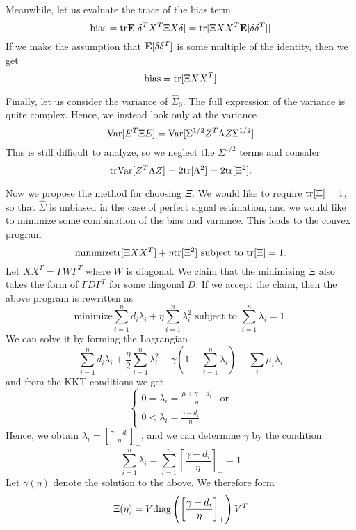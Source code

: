 \documentclass[12pt]{article}
\begin{document}
Meanwhile, let us evaluate the trace of the bias term
\[
\text{bias} = \text{tr}\textbf{E}[\delta^TX^T \Xi X \delta] = \text{tr}[\Xi XX^T \textbf{E}[\delta \delta^T]]
\]
If we make the assumption that $\textbf{E}[\delta \delta^T]$ is some multiple of the identity, then we get
\[
\text{bias} = \text{tr}[\Xi XX^T]
\]

Finally, let us consider the variance of $\hat{\Sigma}_0$.
The full expression of the variance is quite complex.
Hence, we instead look only at the variance
\[
\text{Var}[E^T \Xi E] = \text{Var}[\Sigma^{1/2} Z^T \Lambda Z \Sigma^{1/2}]
\]
This is still difficult to analyze, so we neglect the $\Sigma^{1/2}$ terms and consider
\[
\text{tr}\text{Var}[Z^T \Lambda Z] = 2\text{tr}[\Lambda^2] = 2\text{tr}[\Xi^2].
\]

Now we propose the method for choosing $\Xi$.  We would like to
require $\text{tr}[\Xi] = 1$, so that $\hat{\Sigma}$ is unbiased in the case
of perfect signal estimation, and we would like to minimize some
combination of the bias and variance.  This leads to the convex program
\[
\text{minimize} \text{tr}[\Xi XX^T] + \eta \text{tr}[\Xi^2]\text{ subject to }\text{tr}[\Xi]=1.
\]
Let $XX^T = \Gamma W\Gamma^T$ where $W$ is diagonal.  We claim that
the minimizing $\Xi$ also takes the form of $\Gamma D \Gamma^T$ for
some diagonal $D$.  If we accept the claim, then the above program is
rewritten as
\[
\text{minimize} \sum_{i=1}^n d_i \lambda_i + \eta \sum_{i=1}^n \lambda_i^2 \text{ subject to }\sum_{i=1}^n \lambda_i=1.
\]
We can solve it by forming the Lagrangian
\[
\sum_{i=1}^n d_i \lambda_i + \frac{\eta}{2} \sum_{i=1}^n \lambda_i^2 + \gamma \left(1 - \sum_{i=1}^n \lambda_i\right) - \sum_i \mu_i \lambda_i
\]
and from the KKT conditions we get
\[
\begin{cases}
0 = \lambda_i = \frac{\mu+\gamma - d_i }{\eta} & \text{or}\\
0 < \lambda_i = \frac{\gamma - d_i }{\eta}
\end{cases}
\]
Hence, we obtain $\lambda_i = [\frac{\gamma - d_i }{\eta}]_+$,
and we can determine $\gamma$ by the condition
\[
\sum_{i=1}^n\lambda_i = \sum_{i=1}^n \left[\frac{\gamma - d_i }{\eta}\right]_+
= 1
\]
Let $\gamma(\eta)$ denote the solution to the above.
We therefore form
\[
\Xi(\eta) = V \text{diag}\left(\left[\frac{\gamma - d_i }{\eta}\right]_+\right)V^T
\]
\end{document}
